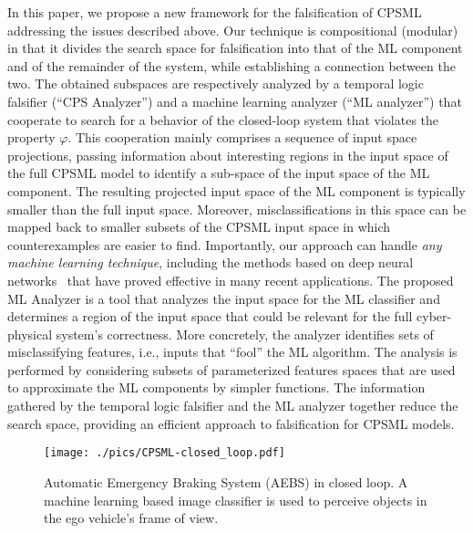 In this paper, we propose a new framework for the falsification of CPSML
addressing the issues described above. 
Our technique is compositional (modular) in that it divides the 
search space for falsification
into that of the ML component and of the
remainder of the system, while 
establishing a connection between the two.
The obtained subspaces are respectively analyzed by 
a temporal logic falsifier (``CPS Analyzer'') and a machine learning
analyzer (``ML analyzer'') that cooperate to search for
a behavior of the closed-loop system that violates the property $\varphi$.
This cooperation mainly comprises a sequence of input space projections,
passing information about interesting regions in the input space
of the full CPSML model to identify a sub-space of the input space
of the ML component. The resulting projected input space of the ML
component is typically smaller than the full input space. Moreover,
misclassifications in this space can be mapped back to smaller subsets
of the CPSML input space in which 
counterexamples are easier to find.
Importantly, our approach can handle {\em any machine learning technique},
including the methods based on deep neural networks~\cite{hinton2012deep} 
that have proved effective in many recent applications.
The proposed ML Analyzer is a tool that analyzes the
input space for the ML classifier and determines
a region of the input space that could be relevant for the full 
cyber-physical system's correctness. More concretely,
the analyzer identifies sets of misclassifying
features, i.e., inputs that ``fool'' the ML algorithm. The analysis 
is performed by considering subsets of parameterized features spaces
that are used to approximate the ML components by simpler functions. 
The information gathered by the temporal logic falsifier and the
ML analyzer together reduce the search space,
providing an efficient approach to falsification for CPSML models.

\begin{figure}
  	\begin{center}
		\texttt{[image: ./pics/CPSML-closed\_loop.pdf]}
	 \end{center}
	\caption{Automatic Emergency Braking System (AEBS) in closed loop. A machine learning based image classifier is used to perceive objects in the ego vehicle's frame of view.\label{fig:aebs_ex}}
\end{figure}


